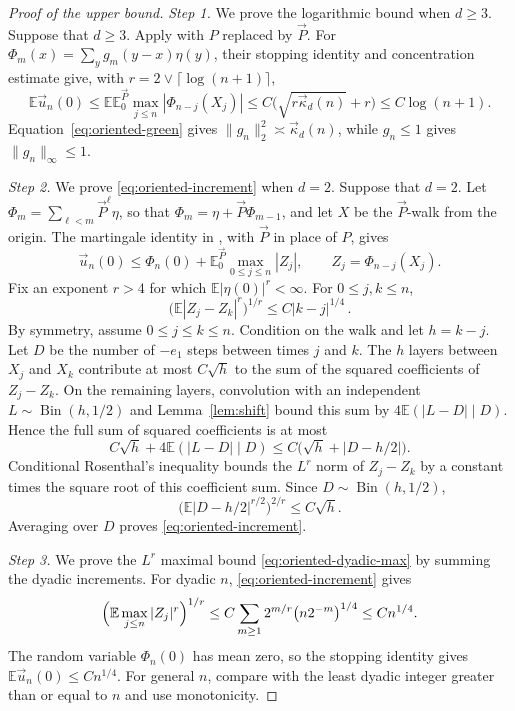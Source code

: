 \documentclass[11pt]{amsart}
\theoremstyle{plain}
\theoremstyle{definition}
\newcommand{\E}{\mathbb{E}}
\begin{document}
\begin{proof}[Proof of the upper bound]
	\smallskip
	\noindent\emph{Step 1.} We prove the logarithmic bound when $d\geq3$.
	Suppose that $d\geq3$. Apply \citet[Lemmas~2.5 and~3.2]{BP} with $P$
	replaced by $\vec P$. For
	$\Phi_m(x)=\sum_y g_m(y-x)\eta(y)$, their stopping identity and
	concentration estimate give, with
	$r=2\vee\lceil\log(n+1)\rceil$,
	\[
		\E \vec u_n(0)\leq\E\E_0^{\vec P}\max_{j\leq n}|\Phi_{n-j}(X_j)|
		\leq C\bigl(\sqrt{r \vec\kappa_d(n)}+r\bigr)
		\leq C\log(n+1).
	\]
	Equation~\eqref{eq:oriented-green} gives
	$\|g_n\|_2^2\asymp\vec\kappa_d(n)$, while $g_n\leq1$ gives
	$\|g_n\|_\infty\leq1$.

	\smallskip
	\noindent\emph{Step 2.} We prove \eqref{eq:oriented-increment} when $d=2$.
	Suppose that $d=2$. Let $\Phi_m=\sum_{\ell<m}\vec P^\ell\eta$, so that
	$\Phi_m=\eta+\vec P\Phi_{m-1}$, and let $X$ be the $\vec P$-walk from the
	origin. The martingale identity in \citet[Lemma~2.5]{BP}, with $\vec P$
	in place of $P$, gives
	\[
		\vec u_n(0)\leq\Phi_n(0)+\E_0^{\vec P}\max_{0\leq j\leq n}|Z_j|,
		\qquad Z_j=\Phi_{n-j}(X_j).
	\]
	Fix an exponent $r>4$ for which $\E|\eta(0)|^r<\infty$. For
	$0\leq j,k\leq n$,
	\begin{equation}\label{eq:oriented-increment}
		\bigl(\E|Z_j-Z_k|^r\bigr)^{1/r}\leq C|k-j|^{1/4}\,.
	\end{equation}
	By symmetry, assume $0\leq j\leq k\leq n$. Condition on the walk and let
	$h=k-j$. Let $D$ be the number of $-e_1$
	steps between times $j$ and $k$. The $h$ layers between $X_j$ and $X_k$
	contribute at most $C\sqrt h$ to the sum of the squared coefficients of
	$Z_j-Z_k$. On the remaining layers, convolution with an independent
	$L\sim\operatorname{Bin}(h,1/2)$ and Lemma~\ref{lem:shift} bound this sum by
	$4\E(|L-D|\mid D)$. Hence the full sum of squared coefficients is at most
	\[
		C\sqrt h+4\E(|L-D|\mid D)
		\leq C\bigl(\sqrt h+|D-h/2|\bigr).
	\]
	Conditional Rosenthal's inequality bounds the $L^r$ norm of $Z_j-Z_k$ by
	a constant times the square root of this coefficient sum. Since
	$D\sim\operatorname{Bin}(h,1/2)$,
	\[
		\bigl(\E|D-h/2|^{r/2}\bigr)^{2/r}\leq C\sqrt h.
	\]
	Averaging over $D$ proves \eqref{eq:oriented-increment}.

	\smallskip
	\noindent\emph{Step 3.} We prove the $L^r$ maximal bound
	\eqref{eq:oriented-dyadic-max} by summing the dyadic increments.
	For dyadic $n$, \eqref{eq:oriented-increment} gives
	\begin{equation}\label{eq:oriented-dyadic-max}
		\Bigl(\E\max_{j\leq n}|Z_j|^r\Bigr)^{1/r}
		\leq C\sum_{m\geq1}2^{m/r}\bigl(n2^{-m}\bigr)^{1/4}
		\leq Cn^{1/4}.
	\end{equation}
	The random variable $\Phi_n(0)$ has mean zero, so the stopping identity
	gives $\E\vec u_n(0)\leq Cn^{1/4}$. For general $n$, compare with the least
	dyadic integer greater than or equal to $n$ and use monotonicity.
\end{proof}
\end{document}
